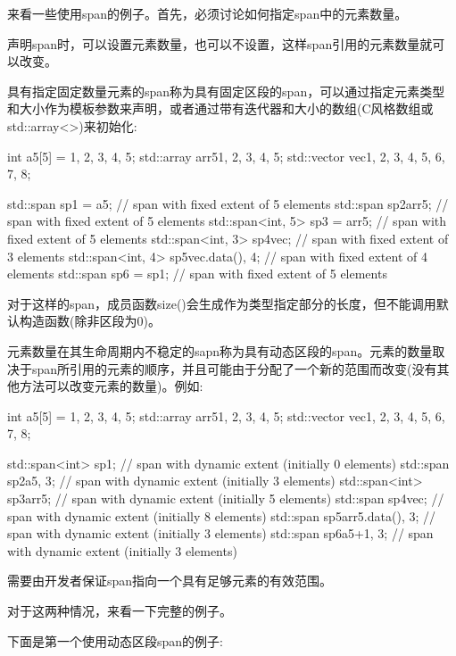 
来看一些使用span的例子。首先，必须讨论如何指定span中的元素数量。


声明span时，可以设置元素数量，也可以不设置，这样span引用的元素数量就可以改变。

具有指定固定数量元素的span称为具有固定区段的span，可以通过指定元素类型和大小作为模板参数来声明，或者通过带有迭代器和大小的数组(C风格数组或std::array<>)来初始化:

\begin{cpp}
int a5[5] = {1, 2, 3, 4, 5};
std::array arr5{1, 2, 3, 4, 5};
std::vector vec{1, 2, 3, 4, 5, 6, 7, 8};

std::span sp1 = a5; // span with fixed extent of 5 elements
std::span sp2{arr5}; // span with fixed extent of 5 elements
std::span<int, 5> sp3 = arr5; // span with fixed extent of 5 elements
std::span<int, 3> sp4{vec}; // span with fixed extent of 3 elements
std::span<int, 4> sp5{vec.data(), 4}; // span with fixed extent of 4 elements
std::span sp6 = sp1; // span with fixed extent of 5 elements
\end{cpp}

对于这样的span，成员函数size()会生成作为类型指定部分的长度，但不能调用默认构造函数(除非区段为0)。

元素数量在其生命周期内不稳定的sapn称为具有动态区段的span。元素的数量取决于span所引用的元素的顺序，并且可能由于分配了一个新的范围而改变(没有其他方法可以改变元素的数量)。例如:

\begin{cpp}
int a5[5] = {1, 2, 3, 4, 5};
std::array arr5{1, 2, 3, 4, 5};
std::vector vec{1, 2, 3, 4, 5, 6, 7, 8};

std::span<int> sp1; // span with dynamic extent (initially 0 elements)
std::span sp2{a5, 3}; // span with dynamic extent (initially 3 elements)
std::span<int> sp3{arr5}; // span with dynamic extent (initially 5 elements)
std::span sp4{vec}; // span with dynamic extent (initially 8 elements)
std::span sp5{arr5.data(), 3}; // span with dynamic extent (initially 3 elements)
std::span sp6{a5+1, 3}; // span with dynamic extent (initially 3 elements)
\end{cpp}

需要由开发者保证span指向一个具有足够元素的有效范围。

对于这两种情况，来看一下完整的例子。


下面是第一个使用动态区段span的例子:

